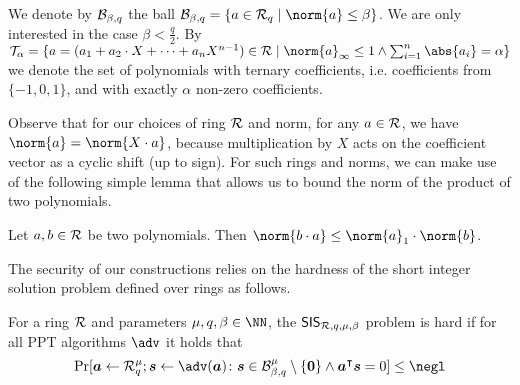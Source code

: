 We denote by $\mathcal{B}_{\beta, q}$ the ball $\ball{\beta}{q} = \{a\in\ring_q\mid \norm{a}\leq\beta\}$. We are only interested in the case $\beta < \tfrac{q}{2}$.
By 
\(
\tern_\alpha = \{a=(a_1+a_2\cdot X + \dots + a_{n}X^{n-1}) \in\ring \mid \norm{a}_\infty\leq 1 \land \sum_{i=1}^{n} \abs{a_i} = \alpha\}
\) %
we denote the set of polynomials with ternary coefficients, i.e. coefficients from $\{-1,0,1\}$, and with exactly $\alpha$ non-zero coefficients.


Observe that for our choices of ring $\mathcal{R}$ and norm, for any $a\in\mathcal{R}$, we have $\norm{a} = \norm{X\cdot a}$, because multiplication by $X$ acts on the coefficient vector as a cyclic shift (up to sign).
For such rings and norms, we can make use of the following simple lemma that allows us to bound the norm of the product of two polynomials.
\begin{lemma}\label{lem:ternbound}
  Let $a,b\in\mathcal{R}$ be two polynomials. Then $\norm{b\cdot a} \leq \norm{a}_1\cdot\norm{b}$.
\end{lemma}

The security of our constructions relies on the hardness of the short integer solution problem defined over rings as follows.
\begin{definition}\label{def:ring-sis}
  For a ring $\mathcal{R}$ and parameters $\mu,q,\beta \in \NN$, the $\mathsf{SIS}_{\mathcal{R},q,\mu,\beta}$ problem is hard if for all PPT algorithms $\adv$ it holds that
  \[
    \Pr[
      \vec{a} \gets \ring_q^\mu; \vec{s}\gets\adv(\vec{a}) \colon \vec{s}\in\ball{\beta}{q}^\mu\setminus\{\vec{0}\} \land \vec{a}^\transpose\vec{s}=0
    ] \leq \negl
  \]
\end{definition}

